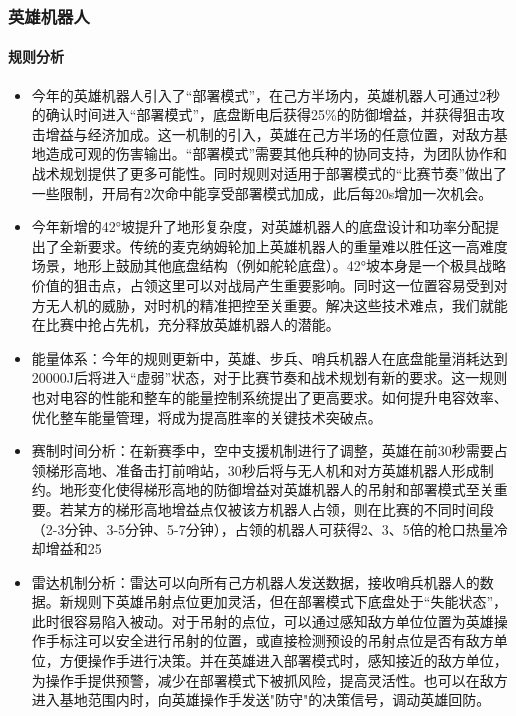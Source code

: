 \subsubsection{英雄机器人}

    \paragraph{规则分析}


        \begin{itemize}
            \item 今年的英雄机器人引入了“部署模式”，在己方半场内，英雄机器人可通过2秒的确认时间进入“部署模式”，底盘断电后获得25\%的防御增益，并获得狙击攻击增益与经济加成。这一机制的引入，英雄在己方半场的任意位置，对敌方基地造成可观的伤害输出。“部署模式”需要其他兵种的协同支持，为团队协作和战术规划提供了更多可能性。同时规则对适用于部署模式的“比赛节奏”做出了一些限制，开局有2次命中能享受部署模式加成，此后每20s增加一次机会。
            
            \item 今年新增的42°坡提升了地形复杂度，对英雄机器人的底盘设计和功率分配提出了全新要求。传统的麦克纳姆轮加上英雄机器人的重量难以胜任这一高难度场景，地形上鼓励其他底盘结构（例如舵轮底盘）。42°坡本身是一个极具战略价值的狙击点，占领这里可以对战局产生重要影响。同时这一位置容易受到对方无人机的威胁，对时机的精准把控至关重要。解决这些技术难点，我们就能在比赛中抢占先机，充分释放英雄机器人的潜能。
            
            \item 能量体系：今年的规则更新中，英雄、步兵、哨兵机器人在底盘能量消耗达到20000J后将进入“虚弱”状态，对于比赛节奏和战术规划有新的要求。这一规则也对电容的性能和整车的能量控制系统提出了更高要求。如何提升电容效率、优化整车能量管理，将成为提高胜率的关键技术突破点。
            
            \item 赛制时间分析：在新赛季中，空中支援机制进行了调整，英雄在前30秒需要占领梯形高地、准备击打前哨站，30秒后将与无人机和对方英雄机器人形成制约。地形变化使得梯形高地的防御增益对英雄机器人的吊射和部署模式至关重要。若某方的梯形高地增益点仅被该方机器人占领，则在比赛的不同时间段（2-3分钟、3-5分钟、5-7分钟），占领的机器人可获得2、3、5倍的枪口热量冷却增益和25%
            
            \item 雷达机制分析：雷达可以向所有己方机器人发送数据，接收哨兵机器人的数据。新规则下英雄吊射点位更加灵活，但在部署模式下底盘处于“失能状态”，此时很容易陷入被动。对于吊射的点位，可以通过感知敌方单位位置为英雄操作手标注可以安全进行吊射的位置，或直接检测预设的吊射点位是否有敌方单位，方便操作手进行决策。并在英雄进入部署模式时，感知接近的敌方单位，为操作手提供预警，减少在部署模式下被抓风险，提高灵活性。也可以在敌方进入基地范围内时，向英雄操作手发送"防守"的决策信号，调动英雄回防。


\end{itemize}
